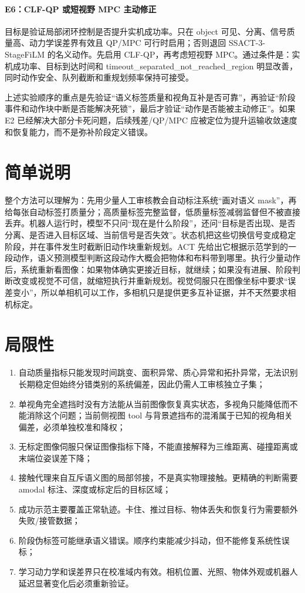 \documentclass[UTF8,a4paper,11pt]{ctexart}
\begin{document}
\paragraph{E6：CLF-QP 或短视野 MPC 主动修正}
目标是验证局部闭环控制是否提升实机成功率。只在 object 可见、分离、信号质量高、动力学误差界有效且 QP/MPC 可行时启用；否则退回 SSACT-3-StageFiLM 的名义动作。先启用 CLF-QP，再考虑短视野 MPC。通过条件是：实机成功率、目标到达时间和 timeout\_separated\_not\_reached\_region 明显改善，同时动作安全、队列截断和重规划频率保持可接受。

上述实验顺序的重点是先验证“语义标签质量和视角互补是否可靠”，再验证“阶段事件和动作块中断是否能解决死锁”，最后才验证“动作是否能被主动修正”。如果 E2 已经解决大部分卡死问题，后续残差/QP/MPC 应被定位为提升运输收敛速度和恢复能力，而不是弥补阶段定义错误。

\section{简单说明}

整个方法可以理解为：先用少量人工审核教会自动标注系统“画对语义 mask”，再给每张自动标签打质量分；高质量标签完整监督，低质量标签减弱监督但不被直接丢弃。机器人运行时，模型不只问“现在是什么阶段”，还问“目标是否出现、是否分离、是否进入目标区域、当前信号是否失效”。状态机把这些切换信号变成稳定阶段，并在事件发生时截断旧动作块重新规划。ACT 先给出它根据示范学到的一段动作，语义预测模型判断这段动作大概会把物体和布料带到哪里。执行少量动作后，系统重新看图像：如果物体确实更接近目标，就继续；如果没有进展、阶段判断改变或视觉不可信，就缩短执行并重新规划。视觉伺服只在图像坐标中要求“误差变小”，所以单相机可以工作，多相机只是提供更多互补证据，并不天然要求相机标定。

\section{局限性}

\begin{enumerate}[leftmargin=2.3em]
  \item 自动质量指标只能发现时间跳变、面积异常、质心异常和拓扑异常，无法识别长期稳定但始终分错类别的系统偏差，因此仍需人工审核独立子集；
  \item 单视角完全遮挡时没有方法能从当前图像恢复真实状态，多视角只能降低而不能消除这个问题；当前侧视图 tool 与背景遮挡布的混淆属于已知的视角相关偏差，必须单独校准和降权；
  \item 无标定图像伺服只保证图像指标下降，不能直接解释为三维距离、碰撞距离或末端位姿误差下降；
  \item 接触代理来自互斥语义图的局部邻接，不是真实物理接触。更精确的判断需要 amodal 标注、深度或标定后的目标区域；
  \item 成功示范主要覆盖正常轨迹。卡住、推过目标、物体丢失和恢复行为需要额外失败/接管数据；
  \item 阶段伪标签可能继承语义错误。顺序约束能减少抖动，但不能修复系统性误标；
  \item 学习动力学和误差界只在校准域内有效。相机位置、光照、物体外观或机器人延迟显著变化后必须重新验证。
\end{enumerate}
\end{document}
